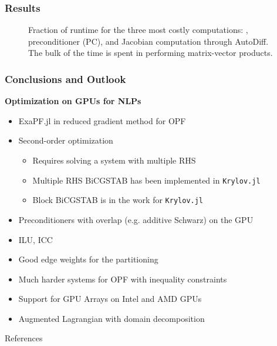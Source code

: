\begin{frame}[fragile]
  \frametitle{Results}
\begin{figure}
\caption{Fraction of runtime for the three most costly computations: \BiCGSTAB, preconditioner (PC), and Jacobian computation through AutoDiff. The bulk of the time is spent in \BiCGSTAB performing matrix-vector products.}
\label{fig:relperformance}
\end{figure}
\end{frame}


\begin{frame}
  \frametitle{Conclusions and Outlook}
  {\bf Optimization on GPUs for NLPs}
  \begin{itemize}
    \item ExaPF.jl in reduced gradient method for OPF
    \item Second-order optimization 
    \begin{itemize}
      \item Requires solving a system with multiple RHS
      \item Multiple RHS BiCGSTAB has been implemented in \lstinline{Krylov.jl}
      \item Block BiCGSTAB is in the work for \lstinline{Krylov.jl}
    \end{itemize}
    \item Preconditioners with overlap (e.g. additive Schwarz) on the GPU
    \item ILU, ICC
    \item Good edge weights for the partitioning
    \item Much harder systems for OPF with inequality constraints
    \item Support for GPU Arrays on Intel and AMD GPUs
    \item Augmented Lagrangian with domain decomposition
  \end{itemize}
\end{frame}

\begin{frame}{References}
    \printbibliography[heading=none]
\end{frame}



